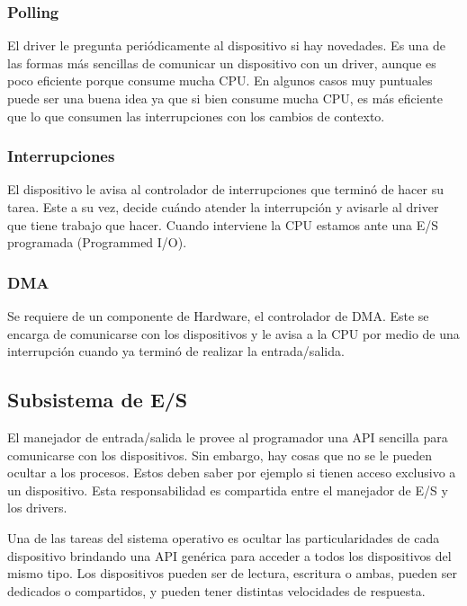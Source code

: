 \documentclass{article}
\begin{document}
\subsubsection{Polling}

El driver le pregunta peri\'odicamente al dispositivo si hay novedades. Es una de las formas m\'as sencillas de comunicar un dispositivo con un driver, aunque es poco eficiente porque consume mucha CPU. En algunos casos muy puntuales puede ser una buena idea ya que si bien consume mucha CPU, es m\'as eficiente que lo que consumen las interrupciones con los cambios de contexto.

\subsubsection{Interrupciones}

El dispositivo le avisa al controlador de interrupciones que termin\'o de hacer su tarea. Este a su vez, decide cu\'ando atender la interrupci\'on y avisarle al driver que tiene trabajo que hacer. Cuando interviene la CPU estamos ante una E/S programada (Programmed I/O).

\subsubsection{DMA}

Se requiere de un componente de Hardware, el controlador de DMA. Este se encarga de comunicarse con los dispositivos y le avisa a la CPU por medio de una interrupci\'on cuando ya termin\'o de realizar la entrada/salida.

\subsection{Subsistema de E/S}

El manejador de entrada/salida le provee al programador una API sencilla para comunicarse con los dispositivos. Sin embargo, hay cosas que no se le pueden ocultar a los procesos. Estos deben saber por ejemplo si tienen acceso exclusivo a un dispositivo. Esta responsabilidad es compartida entre el manejador de E/S y los drivers.

Una de las tareas del sistema operativo es ocultar las particularidades de cada dispositivo brindando una API gen\'erica para acceder a todos los dispositivos del mismo tipo. Los dispositivos pueden ser de lectura, escritura o ambas, pueden ser dedicados o compartidos, y pueden tener distintas velocidades de respuesta.
\end{document}

